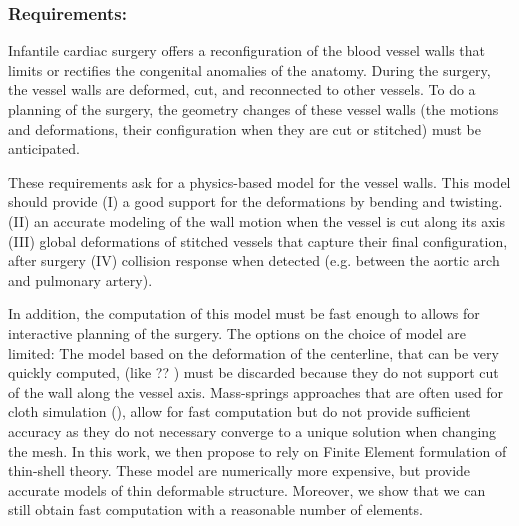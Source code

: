 \subsubsection{Requirements: } 
Infantile cardiac surgery offers a reconfiguration of the blood vessel walls that limits or rectifies the congenital anomalies of the anatomy.
During the surgery, the vessel walls are deformed, cut, and reconnected to other vessels.
To do a planning of the surgery, the geometry changes of these vessel walls (the motions and deformations, their configuration when they are cut or stitched)  must be anticipated.

These requirements ask for a physics-based model for the vessel walls. 
This model should provide 
(I) a good support for the deformations by bending and twisting. 
(II) an accurate modeling of the wall motion when the vessel is cut along its axis 
(III) global deformations of stitched vessels that capture their final configuration, after surgery 
(IV) collision response when detected (e.g. between the aortic arch and pulmonary artery). 

In addition, the computation of this model must be fast enough to allows for interactive planning of the surgery. 
The options on the choice of model are limited: 
The model based on the deformation of the centerline, that can be very quickly computed, (like ??   ) must be discarded because they do not support cut of the wall along the vessel axis. 
Mass-springs approaches that are often used for cloth simulation (), allow for fast computation but do not provide sufficient accuracy as they do not necessary converge to a unique solution when changing the mesh.
In this work, we then propose to rely on Finite Element formulation of thin-shell theory. 
These model are numerically more expensive, but provide accurate models of thin deformable structure.%
Moreover, we show that we can still obtain fast computation with a reasonable number of elements.


